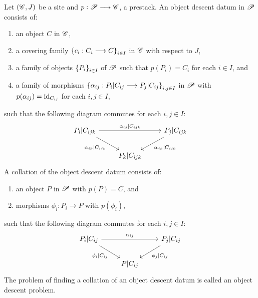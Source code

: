 \documentclass[11pt]{amsart}
\begin{document}
\begin{defn}
Let $(\mathscr{C}, J)$ be a site and $p : \sP \to \sC$, a prestack. An object descent datum
in $\mathscr{P}$ consists of:
\begin{enumerate}
\item an object $C$ in $\mathscr{C}$,
\item a covering family $\set{c_i : C_i \to C}_{i \in I}$ in $\mathscr{C}$ with respect to $J$,
\item a family of objects $\set{P_i}_{i \in I}$ of $\mathscr{P}$ such that $p(P_i) = C_i$ for each
      $i \in I$, and
\item a family of morphisms $\set{\alpha_{ij} : P_i|C_{ij} \to P_j|C_{ij}}_{i, j \in I}$ in $\mathscr{P}$
      with $p(\alpha_{ij}) = \mathrm{id}_{C_{ij}}$ for each $i, j \in I$,
\end{enumerate}
such that the following diagram commutes for each $i, j \in I$:
\[\begin{tikzcd}
P_i|C_{ijk} \ar[rr, "\alpha_{ij}|C_{ijk}" above] \ar[rd, "\alpha_{ik}|C_{ijk}" below left] & &
P_j|C_{ijk} \ar[ld, "\alpha_{jk}|C_{ijk}" below right] \\
& P_{k}|C_{ijk} &
\end{tikzcd}\]
A collation of the object descent datum consists of:
\begin{enumerate}
\item an object $P$ in $\mathscr{P}$ with $p(P) = C$, and
\item morphisms $\phi_i : P_i \to P$ with $p(\phi_i)$,
\end{enumerate}
such that the following diagram commutes for each $i, j \in I$:
\[\begin{tikzcd}
P_i|C_{ij} \ar[rr, "\alpha_{ij}"] \ar[rd, "\phi_i|C_{ij}" below left] & &
P_j|C_{ij} \ar[ld, "\phi_j|C_{ij}" below right] \\
& P|C_{ij} &
\end{tikzcd}\]
The problem of finding a collation of an object descent datum is called an object descent problem.
\end{defn}
\end{document}
